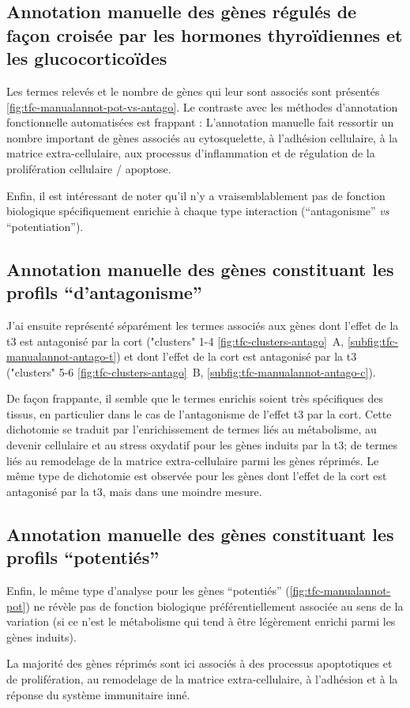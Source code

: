 \documentclass[../main.tex]{subfiles}
\begin{document}
\subsection{Annotation manuelle des gènes régulés de façon croisée par les hormones thyroïdiennes et les glucocorticoïdes}
Les termes relevés et le nombre de gènes qui leur sont associés sont présentés \autoref{fig:tfc-manualannot-pot-vs-antago}.
Le contraste avec les méthodes d'annotation fonctionnelle automatisées est frappant :
L'annotation manuelle fait ressortir un nombre important de gènes associés au cytosquelette, à l'adhésion cellulaire, à la matrice extra-cellulaire, aux processus d'inflammation et de régulation de la prolifération cellulaire / apoptose.



Enfin, il est intéressant de noter qu'il n'y a vraisemblablement pas de fonction biologique spécifiquement enrichie à chaque type interaction (``antagonisme'' \textit{vs} ``potentiation'').


\subsection{Annotation manuelle des gènes constituant les profils ``d'antagonisme''}
J'ai ensuite représenté séparément les termes associés aux gènes dont l'effet de la \gls{t3} est antagonisé par la \gls{cort} ("clusters" 1-4 \autoref{fig:tfc-clusters-antago}~A, \autoref{subfig:tfc-manualannot-antago-t}) et dont l'effet de la \gls{cort} est antagonisé par la \gls{t3} ("clusters" 5-6 \autoref{fig:tfc-clusters-antago}~B, \autoref{subfig:tfc-manualannot-antago-c}).



De façon frappante, il semble que le termes enrichis soient très spécifiques des tissus, en particulier dans le cas de l'antagonisme de l'effet \gls{t3}
par la \gls{cort}.
Cette dichotomie se traduit par l'enrichissement de termes liés au métabolisme, au devenir cellulaire et au stress oxydatif pour les gènes induits par la \gls{t3}; de termes liés au remodelage de la matrice extra-cellulaire parmi les gènes réprimés.
Le même type de dichotomie est observée pour les gènes dont l'effet de la \gls{cort} est antagonisé par la \gls{t3}, mais dans une moindre mesure.


\subsection{Annotation manuelle des gènes constituant les profils ``potentiés''}
Enfin, le même type d'analyse pour les gènes ``potentiés'' (\autoref{fig:tfc-manualannot-pot}) ne révèle pas de fonction biologique préférentiellement associée au sens de la variation (si ce n'est le métabolisme qui tend à être légèrement enrichi parmi les gènes induits).



La majorité des gènes réprimés sont ici associés à des processus apoptotiques et de prolifération, au remodelage de la matrice extra-cellulaire, à l'adhésion et à la réponse du système immunitaire inné.
\end{document}
